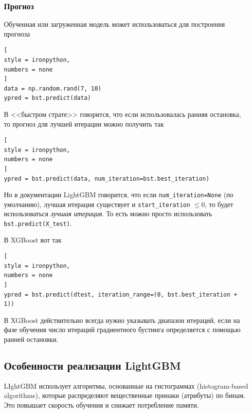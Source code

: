 \documentclass[%
	11pt,
	a4paper,
	utf8,
		]{article}
\begin{document}
\subsubsection{Прогноз}

Обученная или загруженная модель может использоваться для построения прогноза
\begin{lstlisting}[
style = ironpython,
numbers = none
]
data = np.random.rand(7, 10)
ypred = bst.predict(data)
\end{lstlisting}

В <<быстром страте>> говорится, что если использовалась ранняя остановка, то прогноз для лучшей итерации можно получить так
\begin{lstlisting}[
style = ironpython,
numbers = none
]
ypred = bst.predict(data, num_iteration=bst.best_iteration)
\end{lstlisting}

Но в документации LightGBM говорится, что если \verb|num_iteration=None| (по умолчанию), лучшая итерация существует и \verb|start_iteration| $ \leqslant 0 $, то будет использоваться \emph{лучшая итерация}. То есть можно просто использовать \verb|bst.predict(X_test)|.

В XGBoost вот так
\begin{lstlisting}[
style = ironpython,
numbers = none
]
ypred = bst.predict(dtest, iteration_range=(0, bst.best_iteration + 1))
\end{lstlisting}

В XGBoost действительно всегда нужно указывать диапазон итераций, если на фазе обучения число итераций градиентного бустинга определяется с помощью ранней остановки.

\subsection{Особенности реализации LightGBM}

LIghtGBM использует алгоритмы, основанные на гистограммах (histogram-based algorithms), которые распределяют вещественные принаки (атрибуты) по бинам. Это повышает скорость обучения и снижает потребление памяти.
\end{document}

